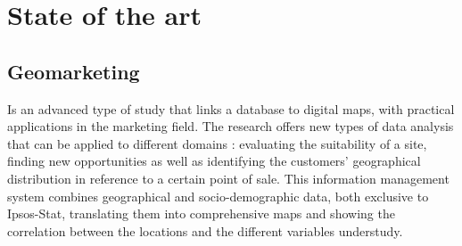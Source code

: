 
\section{State of the art}
\subsection{Geomarketing}
Is an advanced type of study that links a database to digital maps, with
practical applications in the marketing field. The research offers new types of
data analysis that can be applied to different domains : evaluating the
suitability of a site, finding new opportunities as well as identifying the
customers' geographical distribution in reference to a certain point of sale.
This information management system combines geographical and socio-demographic
data, both exclusive to Ipsos-Stat, translating them into comprehensive maps and
showing the correlation between the locations and the different variables
understudy.

